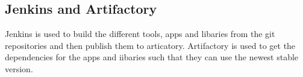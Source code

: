 \subsection{Jenkins and Artifactory}
Jenkins is used to build the different tools, apps and libaries from the git
repositories and then publish them to articatory. Artifactory is used to get the
dependencies for the apps and iibaries such that they can use the newest stable
version.
